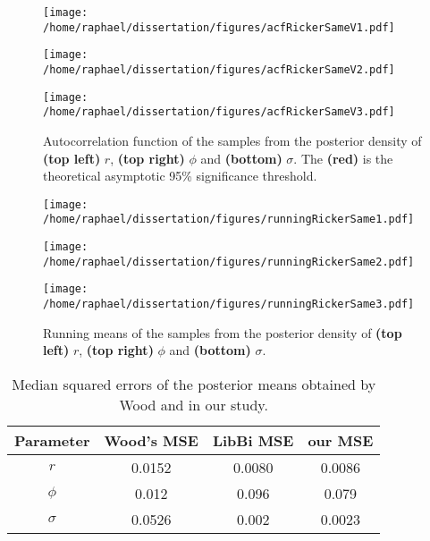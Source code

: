 \documentclass{article}
\newcommand{\ra}[1]{\renewcommand{\arraystretch}{#1}}
\begin{document}
	\begin{figure}[htb]
		\centering
		\begin{minipage}{0.4\textwidth}
			\centering
			\texttt{[image: /home/raphael/dissertation/figures/acfRickerSameV1.pdf]}
		\end{minipage}
		\begin{minipage}{0.4\textwidth}
			\centering
			\texttt{[image: /home/raphael/dissertation/figures/acfRickerSameV2.pdf]}
		\end{minipage}
		\begin{minipage}{0.4\textwidth}
			\centering
			\texttt{[image: /home/raphael/dissertation/figures/acfRickerSameV3.pdf]}
		\end{minipage}
		\caption{Autocorrelation function of the samples from the posterior density of \textbf{(top left)} $r$, \textbf{(top right)} $\phi$ and \textbf{(bottom)} $\sigma$. The \textbf{(red)} is the theoretical asymptotic 95\% significance threshold.}
		\label{fig:acfDiag}
	\end{figure}
	
	\begin{figure}[htb]
		\centering
		\begin{minipage}{0.4\textwidth}
			\centering
			\texttt{[image: /home/raphael/dissertation/figures/runningRickerSame1.pdf]}
		\end{minipage}
		\begin{minipage}{0.4\textwidth}
			\centering
			\texttt{[image: /home/raphael/dissertation/figures/runningRickerSame2.pdf]}
		\end{minipage}
		\begin{minipage}{0.4\textwidth}
			\centering
			\texttt{[image: /home/raphael/dissertation/figures/runningRickerSame3.pdf]}
		\end{minipage}
		\caption{Running means of the samples from the posterior density of \textbf{(top left)} $r$, \textbf{(top right)} $\phi$ and \textbf{(bottom)} $\sigma$.}
		\label{fig:rmDiag}
	\end{figure}
	
	\begin{table}[htb]
		\centering
		\ra{1.3}
		\begin{tabular}{@{}cccc@{}} \toprule
			Parameter & Wood's MSE & LibBi MSE & our MSE\\ \midrule 
			$r$ & 0.0152 & 0.0080 &  0.0086 \\ 
			$\phi$ & 0.012 & 0.096 &  0.079 \\ 
			$\sigma$ & 0.0526 & 0.002 & 0.0023  \\ \bottomrule
		\end{tabular}
		\caption{Median squared errors of the posterior means obtained by Wood and in our study.}
		\label{table:mse}
	\end{table}
\end{document}
